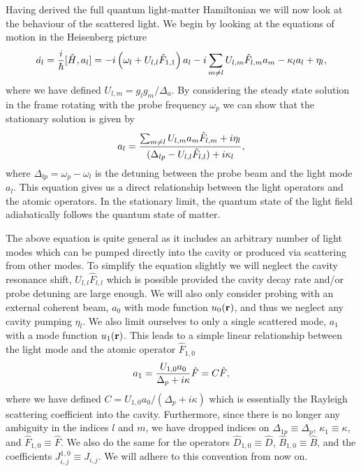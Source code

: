 Having derived the full quantum light-matter Hamiltonian we will now
look at the behaviour of the scattered light. We begin by looking at
the equations of motion in the Heisenberg picture
\begin{equation}
  \dot{a_l} = \frac{i}{\hbar} [\hat{H}, a_l] = 
  -i \left(\omega_l + U_{l,l}\hat{F}_{1,1} \right) a_l
   - i \sum_{m \ne l} U_{l,m} \hat{F}_{l,m} a_m
    - \kappa_l a_l + \eta_l,
\end{equation}
where we have defined $U_{l,m} = g_l g_m / \Delta_a$. By considering
the steady state solution in the frame rotating with the probe
frequency $\omega_p$ we can show that the stationary solution is given
by
\begin{equation}
  a_l = \frac{\sum_{m \ne l} U_{l,m} a_m \hat{F}_{l,m} + i \eta_l} 
  {(\Delta_{lp} - U_{l,l} \hat{F}_{l,l}) + i \kappa_l},
\end{equation}
where $\Delta_{lp} = \omega_p - \omega_l$ is the detuning between the
probe beam and the light mode $a_l$. This equation gives us a direct
relationship between the light operators and the atomic operators. In
the stationary limit, the quantum state of the light field
adiabatically follows the quantum state of matter.

The above equation is quite general as it includes an arbitrary number
of light modes which can be pumped directly into the cavity or
produced via scattering from other modes. To simplify the equation
slightly we will neglect the cavity resonance shift,
$U_{l,l} \hat{F}_{l,l}$ which is possible provided the cavity decay
rate and/or probe detuning are large enough. We will also only
consider probing with an external coherent beam, $a_0$ with mode
function $u_0(\mathbf{r})$, and thus we neglect any cavity pumping
$\eta_l$. We also limit ourselves to only a single scattered mode,
$a_1$ with a mode function $u_1(\mathbf{r})$. This leads to a simple linear
relationship between the light mode and the atomic operator
$\hat{F}_{1,0}$
\begin{equation}
  \label{eq:a}
  a_1 = \frac{U_{1,0} a_0} {\Delta_{p} + i \kappa} \hat{F} =
  C \hat{F},
\end{equation}
where we have defined $C = U_{1,0} a_0 / (\Delta_{p} + i \kappa)$
which is essentially the Rayleigh scattering coefficient into the
cavity. Furthermore, since there is no longer any ambiguity in the
indices $l$ and $m$, we have dropped indices on
$\Delta_{1p} \equiv \Delta_p$, $\kappa_1 \equiv \kappa$, and
$\hat{F}_{1,0} \equiv \hat{F}$. We also do the same for the operators
$\hat{D}_{1,0} \equiv \hat{D}$, $\hat{B}_{1,0} \equiv \hat{B}$, and
the coefficients $J^{1,0}_{i,j} \equiv J_{i,j}$. We will adhere to
this convention from now on.

